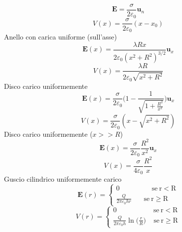 \documentclass{book}
\newcommand{\h}{\mathbf}
\newcommand{\e}{\begin{equation}}
\newcommand{\ex}{\end{equation} }
\begin{document}
\begin{multicols}{4}
\begin{itemize}
        \e{\h{E}=\frac{\sigma}{2\varepsilon_0} \h{u}_n } \ex
        \e{V(x)=\frac{\sigma}{2\varepsilon_0}(x-x_0)} \ex   
    Anello con carica uniforme (sull’asse)
        \e{\h{E}(x)=\frac{\lambda R x}{2\varepsilon_0(x^2+R^2)^{3/2}} \h{u}_x} \ex
        \e{V(x)=\frac{\lambda R}{2\varepsilon_0\sqrt{x^2+R^2}}} \ex
    Disco carico uniformemente
        \e{\h{E}(x)=\frac{\sigma}{2\varepsilon_0}\biggl( 1-\frac{1}{\sqrt{1+\frac{R^2}{x^2}}} \biggr)\h{u}_x}\ex
        \e{V(x)=\frac{\sigma}{2\varepsilon_0}(x-\sqrt{x^2+R^2})}\ex
    Disco carico uniformemente ($x>>R$)
        \e{\h{E}(x)=\frac{\sigma}{2\varepsilon_0}\frac{R^2}{x^2}\h{u}_x}\ex
        \e{V(x)=\frac{\sigma}{4\varepsilon_0}\frac{R^2}{x}} \ex
    Guscio cilindrico uniformemente carico
        \e{ \h{E}(r)=\begin{cases} 
        0 \qquad \qquad \ \ \mathrm{\ se\ r<R}\\
        \frac{Q}{2\pi\varepsilon_0 h r} \ \ \ \ \ \ \ \mathrm{\ se\ r\geq R}\end{cases} } \ex
        \e{ V(r)=\begin{cases} 
        0 \qquad \qquad \ \ \ \ \ \mathrm{\ se\ r<R}\\
        \frac{Q}{2\pi\varepsilon_0 h} \ln\bigl(\frac{r}{R}\bigr)  \ \ \ \ \mathrm{\ se\ r\geq R}\end{cases} } \ex
    


\end{itemize}
\end{multicols}
\end{document}
